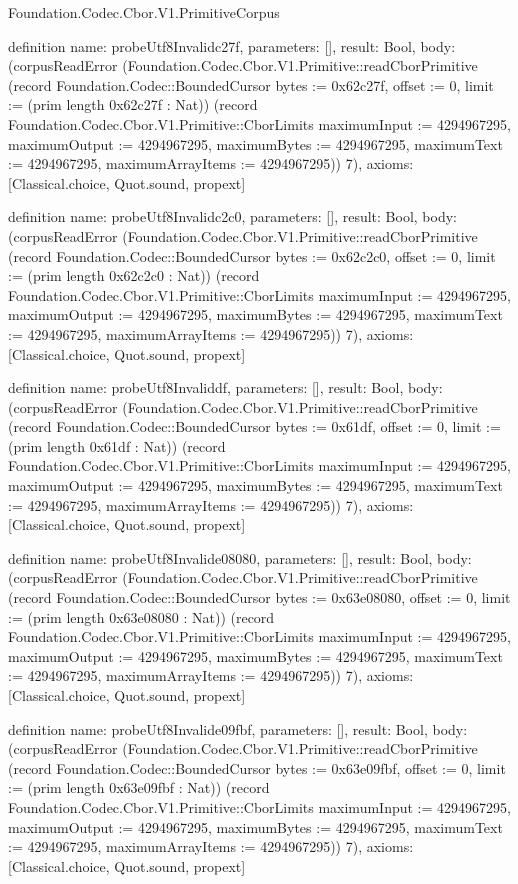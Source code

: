\begin{lexlean}{Foundation.Codec.Cbor.V1.PrimitiveCorpus}
\begin{semanticmodule}
definition{
  name: probeUtf8Invalidc27f,
  parameters: [],
  result: Bool,
  body: (corpusReadError (Foundation.Codec.Cbor.V1.Primitive::readCborPrimitive (record Foundation.Codec::BoundedCursor {bytes := 0x62c27f, offset := 0, limit := (prim length 0x62c27f : Nat)}) (record Foundation.Codec.Cbor.V1.Primitive::CborLimits {maximumInput := 4294967295, maximumOutput := 4294967295, maximumBytes := 4294967295, maximumText := 4294967295, maximumArrayItems := 4294967295})) 7),
  axioms: [Classical.choice, Quot.sound, propext]
}

definition{
  name: probeUtf8Invalidc2c0,
  parameters: [],
  result: Bool,
  body: (corpusReadError (Foundation.Codec.Cbor.V1.Primitive::readCborPrimitive (record Foundation.Codec::BoundedCursor {bytes := 0x62c2c0, offset := 0, limit := (prim length 0x62c2c0 : Nat)}) (record Foundation.Codec.Cbor.V1.Primitive::CborLimits {maximumInput := 4294967295, maximumOutput := 4294967295, maximumBytes := 4294967295, maximumText := 4294967295, maximumArrayItems := 4294967295})) 7),
  axioms: [Classical.choice, Quot.sound, propext]
}

definition{
  name: probeUtf8Invaliddf,
  parameters: [],
  result: Bool,
  body: (corpusReadError (Foundation.Codec.Cbor.V1.Primitive::readCborPrimitive (record Foundation.Codec::BoundedCursor {bytes := 0x61df, offset := 0, limit := (prim length 0x61df : Nat)}) (record Foundation.Codec.Cbor.V1.Primitive::CborLimits {maximumInput := 4294967295, maximumOutput := 4294967295, maximumBytes := 4294967295, maximumText := 4294967295, maximumArrayItems := 4294967295})) 7),
  axioms: [Classical.choice, Quot.sound, propext]
}

definition{
  name: probeUtf8Invalide08080,
  parameters: [],
  result: Bool,
  body: (corpusReadError (Foundation.Codec.Cbor.V1.Primitive::readCborPrimitive (record Foundation.Codec::BoundedCursor {bytes := 0x63e08080, offset := 0, limit := (prim length 0x63e08080 : Nat)}) (record Foundation.Codec.Cbor.V1.Primitive::CborLimits {maximumInput := 4294967295, maximumOutput := 4294967295, maximumBytes := 4294967295, maximumText := 4294967295, maximumArrayItems := 4294967295})) 7),
  axioms: [Classical.choice, Quot.sound, propext]
}

definition{
  name: probeUtf8Invalide09fbf,
  parameters: [],
  result: Bool,
  body: (corpusReadError (Foundation.Codec.Cbor.V1.Primitive::readCborPrimitive (record Foundation.Codec::BoundedCursor {bytes := 0x63e09fbf, offset := 0, limit := (prim length 0x63e09fbf : Nat)}) (record Foundation.Codec.Cbor.V1.Primitive::CborLimits {maximumInput := 4294967295, maximumOutput := 4294967295, maximumBytes := 4294967295, maximumText := 4294967295, maximumArrayItems := 4294967295})) 7),
  axioms: [Classical.choice, Quot.sound, propext]
}


\end{semanticmodule}
\end{lexlean}
